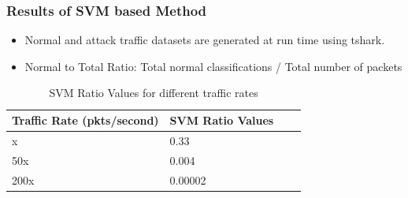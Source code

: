 \documentclass[10pt]{beamer}
\begin{document}
\begin{frame}
\frametitle{Results of SVM based Method}

\begin{itemize}
\footnotesize
\item
Normal and attack traffic datasets are generated at run time using tshark.

\item
Normal to Total Ratio: Total normal classifications / Total number of packets
\end{itemize}

\begin{table}
\scriptsize
\begin{center}
\begin{tabular}{ | m{2cm} | m{2cm}| m{2cm} | m{2cm} |} 
\hline
\textbf{Traffic Rate (pkts/second)} & \textbf{SVM Ratio Values} \\
\hline
x &
0.33 \\
\hline
50x &
0.004 \\
\hline
200x &
0.00002 \\
\hline
\end{tabular}
\end{center}
\caption{\footnotesize SVM Ratio Values for different traffic rates}
\end{table}
\end{frame}
\end{document}
